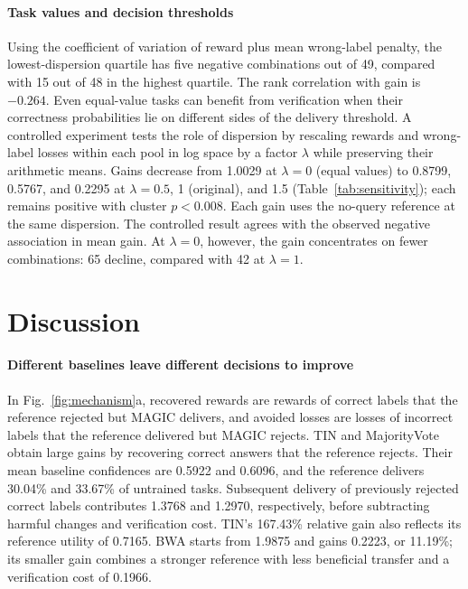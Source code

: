\documentclass[journal]{IEEEtran}
\begin{document}
\paragraph{Task values and decision thresholds}
Using the coefficient of variation of reward plus mean wrong-label penalty, the lowest-dispersion quartile has five negative combinations out of 49, compared with 15 out of 48 in the highest quartile. The rank correlation with gain is $-0.264$. Even equal-value tasks can benefit from verification when their correctness probabilities lie on different sides of the delivery threshold. A controlled experiment tests the role of dispersion by rescaling rewards and wrong-label losses within each pool in log space by a factor $\lambda$ while preserving their arithmetic means. Gains decrease from 1.0029 at $\lambda=0$ (equal values) to 0.8799, 0.5767, and 0.2295 at $\lambda=0.5$, 1 (original), and 1.5 (Table~\ref{tab:sensitivity}); each remains positive with cluster $p<0.008$. Each gain uses the no-query reference at the same dispersion. The controlled result agrees with the observed negative association in mean gain. At $\lambda=0$, however, the gain concentrates on fewer combinations: 65 decline, compared with 42 at $\lambda=1$.

\section{Discussion}
\label{sec:discussion}
\paragraph{Different baselines leave different decisions to improve}
In Fig.~\ref{fig:mechanism}a, recovered rewards are rewards of correct labels that the reference rejected but MAGIC delivers, and avoided losses are losses of incorrect labels that the reference delivered but MAGIC rejects. TIN and MajorityVote obtain large gains by recovering correct answers that the reference rejects. Their mean baseline confidences are 0.5922 and 0.6096, and the reference delivers 30.04\% and 33.67\% of untrained tasks. Subsequent delivery of previously rejected correct labels contributes 1.3768 and 1.2970, respectively, before subtracting harmful changes and verification cost. TIN's 167.43\% relative gain also reflects its reference utility of 0.7165. BWA starts from 1.9875 and gains 0.2223, or 11.19\%; its smaller gain combines a stronger reference with less beneficial transfer and a verification cost of 0.1966.
\end{document}
